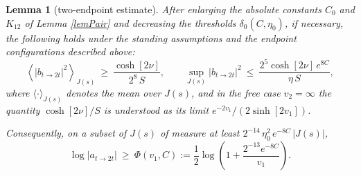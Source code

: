 \documentclass[11pt,twoside,reqno]{amsart}
\def\to{\rightarrow}
\def\d{\delta}
\theoremstyle{plain}
\newtheorem{lemma}{Lemma}
\numberwithin{equation}{section}
\begin{document}
\begin{lemma}[two-endpoint estimate]\label{lemSweep}
After enlarging the absolute constants $C_0$ and $K_{12}$ of Lemma \ref{lemPair} and decreasing the thresholds $\d_0(C,\eta_0)$, if necessary, the following holds under the standing assumptions and the endpoint configurations described above:
\begin{equation}
\left\langle |b_{t\to2t}|^2\right\rangle_{J(s)}\ \geq\ \frac{\cosh[2\nu]}{2^8\,S},
\qquad
\sup_{J(s)}|b_{t\to2t}|^2\ \leq\ \frac{2^5\cosh[2\nu]\,e^{8C}}{\eta\,S},
\label{eqSweepMoments}
\end{equation}
where $\langle\cdot\rangle_{J(s)}$ denotes the mean over $J(s)$, and in the free case $v_2=\infty$ the quantity $\cosh[2\nu]/S$ is understood as its limit $e^{-2v_1}/(2\sinh[2v_1])$.

Consequently, on a subset of $J(s)$ of measure at least $2^{-14}\,\eta_0^2\,e^{-8C}\,|J(s)|$,
\begin{equation}
\log|a_{t\to2t}|\ \geq\ \Phi(v_1,C):=\frac12\log\left(1+\frac{2^{-13}e^{-8C}}{v_1}\right).
\label{eqSweepLevel}
\end{equation}
\end{lemma}
\end{document}
